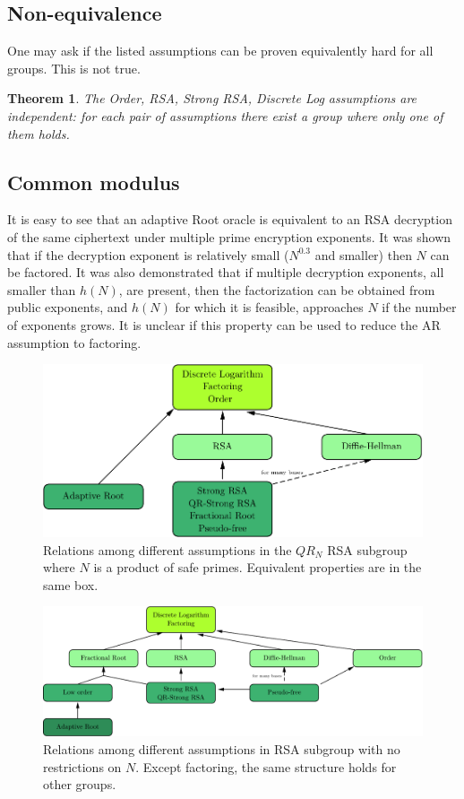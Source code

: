 \documentclass[a4paper]{article}
\newtheorem{theorem}{Theorem}
\begin{document}
\subsection{Non-equivalence}

One may ask if the listed assumptions can be proven equivalently hard for all groups. This is not true.
\begin{theorem}\cite{LM71,DBLP:conf/tcc/Rivest04} The Order, RSA, Strong RSA, Discrete Log assumptions are independent: for each pair of assumptions there exist a group where only one of them holds.
\end{theorem}

\subsection{Common modulus}
It is easy to see that an adaptive Root oracle is equivalent to an RSA decryption of the same ciphertext under multiple prime encryption exponents. It was shown that if the decryption exponent is relatively small ($N^{0.3}$ and smaller) then $N$ can be factored. It was also demonstrated that if multiple  decryption exponents, all smaller than $h(N)$, are present, then the factorization can be obtained from public exponents, and $h(N)$ for which it is feasible, approaches $N$ if the number of exponents grows. It is unclear if this property can be used to reduce the AR assumption to factoring.


\begin{figure}
    \centering
    \includegraphics[scale=0.7]{pics/RSA-QR.pdf}
    \caption{Relations among different assumptions in the $QR_N$ RSA subgroup where $N$ is a product of safe primes. Equivalent properties are in the same box.}
    \label{fig:rsa}
\end{figure}

\begin{figure}
    \centering
    \includegraphics[scale=0.7]{pics/RSA-reg.pdf}
    \caption{Relations among different assumptions in  RSA subgroup with no restrictions on $N$. Except factoring, the same structure holds for  other  groups.}
    \label{fig:rsa}
\end{figure}
\end{document}
